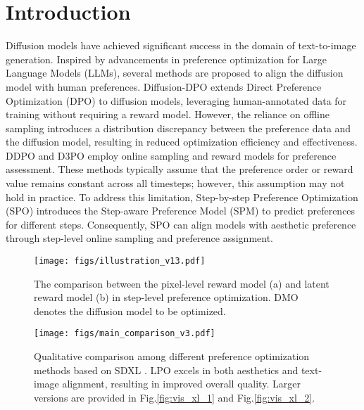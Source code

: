 \section{Introduction}
\label{sec:introduction}

\renewcommand{\thefootnote}{} 

Diffusion models \cite{sd3} have achieved significant success in the domain of text-to-image generation. 
Inspired by advancements in preference optimization \cite{llama2, llama3} for Large Language Models (LLMs), several methods are proposed to align the diffusion model with human preferences. Diffusion-DPO \cite{diffusion_dpo} extends Direct Preference Optimization (DPO) \cite{dpo} to diffusion models, leveraging human-annotated data for training without requiring a reward model. However, the reliance on offline sampling introduces a distribution discrepancy between the preference data and the diffusion model, resulting in reduced optimization efficiency and effectiveness. DDPO \cite{ddpo} and D3PO \cite{d3po} employ online sampling and reward models for preference assessment. These methods typically assume that the preference order or reward value remains constant across all timesteps; however, this assumption may not hold in practice. To address this limitation, Step-by-step Preference Optimization (SPO) \cite{spo} introduces the Step-aware Preference Model (SPM) to predict preferences for different steps. Consequently, SPO can align models with aesthetic preference through step-level online sampling and preference assignment.

\begin{figure}[t]
    \centering
    \texttt{[image: figs/illustration\_v13.pdf]}
    \vspace{-20pt}
    \caption{The comparison between the pixel-level reward model (a) and latent reward model (b) in step-level preference optimization. DMO denotes the diffusion model to be optimized.}
    \label{fig:illustration}
    \vspace{-12pt}
\end{figure}

\begin{figure*}[t]
    \centering
    \texttt{[image: figs/main\_comparison\_v3.pdf]}
    \vspace{-23pt}
    \caption{Qualitative comparison among different preference optimization methods based on SDXL \cite{sdxl}. LPO excels in both aesthetics and text-image alignment, resulting in improved overall quality. Larger versions are provided in Fig.\;\ref{fig:vis_xl_1} and Fig.\;\ref{fig:vis_xl_2}.}
    \label{fig:main_comparison}
    \vspace{-5pt}
\end{figure*}

